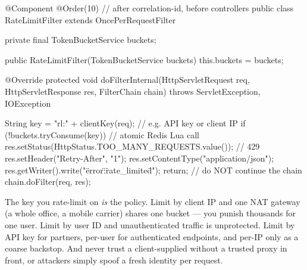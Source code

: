 \begin{javabox}
@Component
@Order(10)   // after correlation-id, before controllers
public class RateLimitFilter extends OncePerRequestFilter {

  private final TokenBucketService buckets;

  public RateLimitFilter(TokenBucketService buckets) {
    this.buckets = buckets;
  }

  @Override
  protected void doFilterInternal(HttpServletRequest req,
      HttpServletResponse res, FilterChain chain)
      throws ServletException, IOException {

    String key = "rl:" + clientKey(req);       // e.g. API key or client IP
    if (!buckets.tryConsume(key)) {            // atomic Redis Lua call
      res.setStatus(HttpStatus.TOO_MANY_REQUESTS.value());  // 429
      res.setHeader("Retry-After", "1");
      res.setContentType("application/json");
      res.getWriter().write("{\"error\":\"rate_limited\"}");
      return;                                  // do NOT continue the chain
    }
    chain.doFilter(req, res);
  }
}
\end{javabox}

\begin{secwarn}
The key you rate-limit on \emph{is} the policy. Limit by client IP and one NAT gateway (a whole office, a mobile carrier) shares one bucket --- you punish thousands for one user. Limit by user ID and unauthenticated traffic is unprotected. Limit by API key for partners, per-user for authenticated endpoints, and per-IP only as a coarse backstop. And never trust a client-supplied  without a trusted proxy in front, or attackers simply spoof a fresh identity per request.
\end{secwarn}

